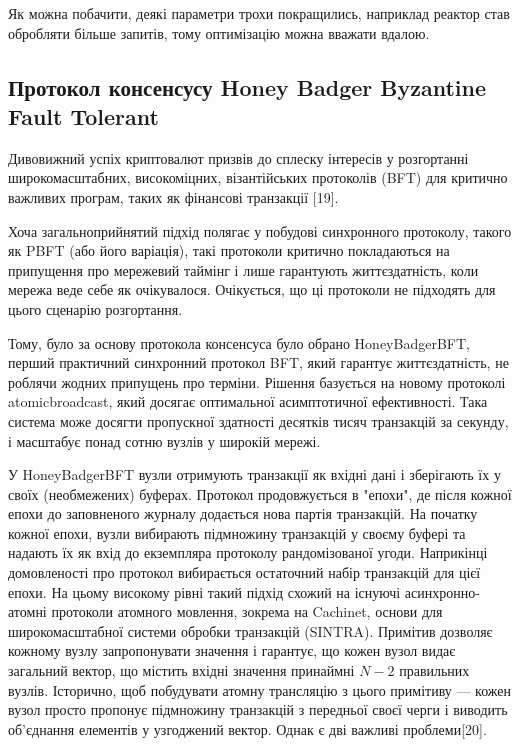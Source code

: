 \documentclass{lib/styles/default-style}
\begin{document}
    Як можна побачити, деякі параметри трохи покращились, наприклад реактор став обробляти більше запитів, тому оптимізацію можна вважати вдалою.

\subsection{Протокол консенсусу Honey Badger Byzantine Fault Tolerant}

    Дивовижний успіх криптовалют призвів до сплеску інтересів у розгортанні широкомасштабних,
    високоміцних, візантійських протоколів (BFT) для критично важливих програм,
    таких як фінансові транзакції [19].
    
    Хоча загальноприйнятий підхід полягає у побудові синхронного протоколу, такого як PBFT (або його варіація),
    такі протоколи критично покладаються на припущення про мережевий таймінг і лише гарантують життєздатність,
    коли мережа веде себе як очікувалося. Очікується, що ці протоколи не підходять для цього сценарію розгортання.
    
    Тому, було за основу протокола консенсуса було обрано HoneyBadgerBFT,
    перший практичний синхронний протокол BFT, який гарантує життєздатність,
    не роблячи жодних припущень про терміни. Рішення базується на новому протоколі atomicbroadcast,
    який досягає оптимальної асимптотичної ефективності. Така система може досягти пропускної здатності десятків тисяч транзакцій за секунду,
    і масштабує понад сотню вузлів у широкій мережі.

    У HoneyBadgerBFT вузли отримують транзакції як вхідні дані і зберігають їх у своїх
    (необмежених) буферах.
    Протокол продовжується в "епохи", де після кожної епохи до заповненого журналу додається нова партія транзакцій.
    На початку кожної епохи, вузли вибирають підмножину транзакцій у своєму буфері
    та надають їх як вхід до екземпляра протоколу рандомізованої угоди.
    Наприкінці домовленості про протокол вибирається остаточний набір транзакцій для цієї епохи.
    На цьому високому рівні такий підхід схожий на існуючі асинхронно-атомні протоколи атомного мовлення,
    зокрема на Cachinet, основи для широкомасштабної системи обробки транзакцій (SINTRA).
    Примітив дозволяє кожному вузлу запропонувати значення і гарантує, що кожен вузол видає загальний вектор,
    що містить вхідні значення принаймні $N-2$ правильних вузлів.
    Історично, щоб побудувати атомну трансляцію з цього примітиву --- кожен вузол просто пропонує підмножину транзакцій
    з передньої своєї черги і виводить об'єднання елементів у узгоджений вектор. Однак є дві важливі проблеми[20].
\end{document}
